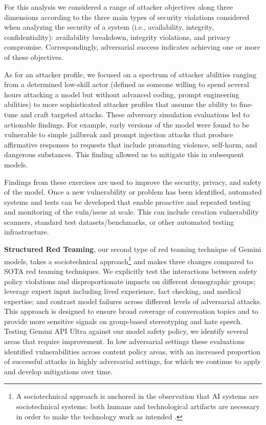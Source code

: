 For this analysis we considered a range of attacker objectives along three dimensions according to the three main types of security violations considered when analyzing the security of a system (i.e., availability, integrity, confidentiality): availability breakdown, integrity violations, and privacy compromise. Correspondingly, adversarial success indicates achieving one or more of these objectives. 

As for an attacker profile, we focused on a spectrum of attacker abilities ranging from a determined low-skill actor (defined as someone willing to spend several hours attacking a model but without advanced coding, prompt engineering abilities) to more sophisticated attacker profiles that assume the ability to fine-tune and craft targeted attacks.  
These adversary simulation evaluations led to actionable findings. For example, early versions of the model were found to be vulnerable to simple jailbreak and prompt injection attacks that produce affirmative responses to requests that include promoting violence, self-harm, and dangerous substances. This finding allowed us to mitigate this in subsequent models.

Findings from these exercises are used to improve the security, privacy, and safety of the model. Once a new vulnerability or problem has been identified, automated systems and tests can be developed that enable proactive and repeated testing and monitoring of the vuln/issue at scale. This can include creation vulnerability scanners, standard test datasets/benchmarks, or other automated testing infrastructure. 

\textbf{Structured Red Teaming}, our second type of red teaming technique of Gemini models, takes a sociotechnical approach\footnote{A sociotechnical approach is anchored in the observation that AI systems are sociotechnical systems: both humans and technological artifacts are necessary in order to make the technology work as intended \citep{Selbst2019}.} and makes three changes compared to SOTA red teaming techniques. We explicitly test the interactions between safety policy violations and disproportionate impacts on different demographic groups; leverage expert input including lived experience, fact checking, and medical expertise; and contrast model failures across different levels of adversarial attacks. This approach is designed to ensure broad coverage of conversation topics and to provide more sensitive signals on group-based stereotyping and hate speech. Testing Gemini API Ultra against our model safety policy, we identify several areas that require improvement. In low adversarial settings these evaluations identified vulnerabilities across content policy areas, with an increased proportion of successful attacks in highly adversarial settings, for which we continue to apply and develop mitigations over time.


